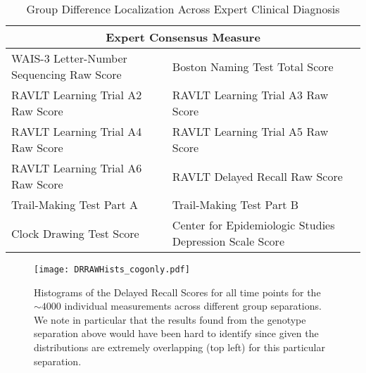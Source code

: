 \begin{table}[h]
	\centering
	\begin{tabular}{p{5.5cm}p{6cm}}
		\toprule
		\multicolumn{2}{c}{\textbf{Expert Consensus Measure}}\\ \midrule \midrule
		WAIS-3 Letter-Number Sequencing Raw Score &
		Boston Naming Test Total Score \\
		RAVLT Learning Trial A2 Raw Score &
		RAVLT Learning Trial A3 Raw Score \\
		RAVLT Learning Trial A4 Raw Score &
		RAVLT Learning Trial A5 Raw Score \\
		RAVLT Learning Trial A6 Raw Score &
		RAVLT Delayed Recall Raw Score \\
		Trail-Making Test Part A &
		Trail-Making Test Part B \\
		Clock Drawing Test Score &
		Center for Epidemiologic Studies Depression Scale Score \\
		\bottomrule
		\bottomrule
	\end{tabular}
	\caption{Group Difference Localization Across Expert Clinical Diagnosis}
	\label{fig:cogcc}
\end{table}

\begin{figure}[hb!]
\centering
\texttt{[image: DRRAWHists\_cogonly.pdf]}
\caption{Histograms of the Delayed Recall Scores for all time points for the $\sim 4000$ individual measurements across different group separations. We note in particular that the results found from the genotype separation above would have been hard to identify since given the distributions are extremely overlapping (top left) for this particular separation.}
\end{figure}
